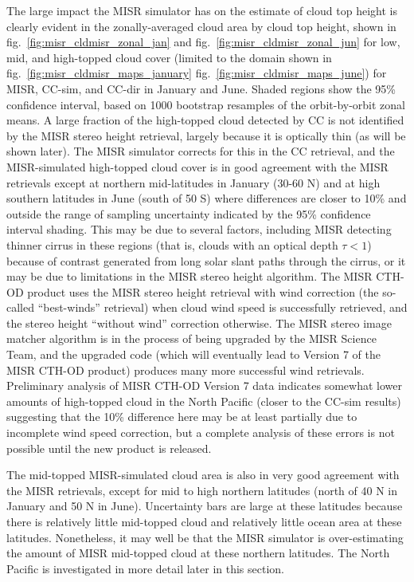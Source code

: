 The large impact the MISR simulator has on the estimate of cloud top
height is clearly evident in the zonally-averaged cloud area by cloud
top height, shown in fig.~\ref{fig:misr_cldmisr_zonal_jan} and
fig.~\ref{fig:misr_cldmisr_zonal_jun} for low, mid, and high-topped
cloud cover (limited to the domain shown in
fig.~\ref{fig:misr_cldmisr_maps_january}
fig.~\ref{fig:misr_cldmisr_maps_june}) for MISR, CC-sim, and CC-dir in
January and June. Shaded regions show the 95\% confidence interval,
based on 1000 bootstrap resamples of the orbit-by-orbit zonal means. A
large fraction of the high-topped cloud detected by CC is not identified
by the MISR stereo height retrieval, largely because it is optically
thin (as will be shown later). The MISR simulator corrects for this in
the CC retrieval, and the MISR-simulated high-topped cloud cover is in
good agreement with the MISR retrievals except at northern mid-latitudes
in January (30-60 N) and at high southern latitudes in June (south of 50
S) where differences are closer to 10\% and outside the range of
sampling uncertainty indicated by the 95\% confidence interval shading.
This may be due to several factors, including MISR detecting thinner
cirrus in these regions (that is, clouds with an optical depth
\(\tau < 1\)) because of contrast generated from long solar slant paths
through the cirrus, or it may be due to limitations in the MISR stereo
height algorithm. The MISR CTH-OD product uses the MISR stereo height
retrieval with wind correction (the so-called ``best-winds'' retrieval)
when cloud wind speed is successfully retrieved, and the stereo height
``without wind'' correction otherwise. The MISR stereo image matcher
algorithm is in the process of being upgraded by the MISR Science Team,
and the upgraded code (which will eventually lead to Version 7 of the
MISR CTH-OD product) produces many more successful wind retrievals.
Preliminary analysis of MISR CTH-OD Version 7 data indicates somewhat
lower amounts of high-topped cloud in the North Pacific (closer to the
CC-sim results) suggesting that the 10\% difference here may be at least
partially due to incomplete wind speed correction, but a complete
analysis of these errors is not possible until the new product is
released.

The mid-topped MISR-simulated cloud area is also in very good agreement
with the MISR retrievals, except for mid to high northern latitudes
(north of 40 N in January and 50 N in June). Uncertainty bars are large
at these latitudes because there is relatively little mid-topped cloud
and relatively little ocean area at these latitudes. Nonetheless, it may
well be that the MISR simulator is over-estimating the amount of MISR
mid-topped cloud at these northern latitudes. The North Pacific is
investigated in more detail later in this section.

